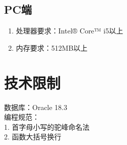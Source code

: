 \subsection{PC端}
	\begin{enumerate}
		\item 处理器要求：Intel® Core™ i5以上
		\item 内存要求：512MB以上 
	\end{enumerate}
\section{技术限制}
\noindent
数据库：Oracle 18.3 \\
编程规范：\\
    1. 首字母小写的驼峰命名法\\
    2. 函数大括号换行\\